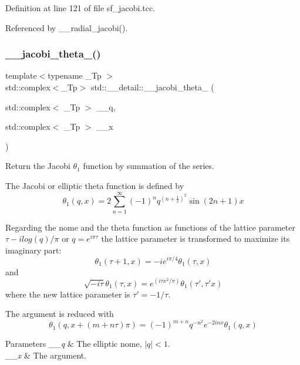 Definition at line 121 of file sf\+\_\+jacobi.\+tcc.



Referenced by \+\_\+\+\_\+radial\+\_\+jacobi().

\mbox{\label{namespacestd_1_1____detail_aa6cd18ad2e630e4d412007bf2371fb34}} 
\subsubsection{\texorpdfstring{\+\_\+\+\_\+jacobi\+\_\+theta\+\_()}{\_\_jacobi\_theta\_1()}\hspace{0.1cm}{\footnotesize\ttfamily [1/2]}}
{\footnotesize\ttfamily template$<$typename \+\_\+\+Tp $>$ \\
std\+::complex$<$\+\_\+\+Tp$>$ std\+::\+\_\+\+\_\+detail\+::\+\_\+\+\_\+jacobi\+\_\+theta\+\_ (\begin{DoxyParamCaption}\item[{std\+::complex$<$ \+\_\+\+Tp $>$}]{\+\_\+\+\_\+q,  }\item[{std\+::complex$<$ \+\_\+\+Tp $>$}]{\+\_\+\+\_\+x }\end{DoxyParamCaption})}

Return the Jacobi $ \theta_1 $ function by summation of the series.

The Jacobi or elliptic theta function is defined by \[ \theta_1(q,x) = 2\sum_{n=1}^{\infty}(-1)^n q^{(n+\frac{1}{2})^2}\sin{(2n+1)x} \]

Regarding the nome and the theta function as functions of the lattice parameter $ \tau -i log(q)/ \pi $ or $ q = e^{i\pi\tau} $ the lattice parameter is transformed to maximize its imaginary part\+: \[ \theta_1(\tau+1,x) = -i e^{i\pi/4}\theta_1(\tau,x) \] and \[ \sqrt{-i\tau}\theta_1(\tau,x) = e^{(i\tau x^2/\pi)}\theta_1(\tau',\tau' x) \] where the new lattice parameter is $ \tau' = -1/\tau $.

The argument is reduced with \[ \theta_1(q, x+(m+n\tau)\pi) = (-1)^{m+n}q^{-n^2}e^{-2inx}\theta_1(q, x) \]


\begin{DoxyParams}{Parameters}
{\em \+\_\+\+\_\+q} & The elliptic nome, $ |q| < 1 $. \\
\hline
{\em \+\_\+\+\_\+x} & The argument. \\
\hline
\end{DoxyParams}


